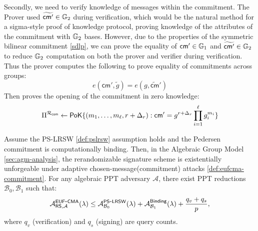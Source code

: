 Secondly, we need to verify knowledge of messages within the commitment. The Prover used $\widetilde{\mathsf{cm}'} \in \mathbb{G}_2$ during verification, which would be the natural method for a sigma-style proof of knowledge protocol, proving knowledge of the attributes of the commitment with $\mathbb{G}_2$ bases. However, due to the properties of the symmetric bilinear commitment \ref{sdlp}, we can prove the equality of $\mathsf{cm}' \in \mathbb{G}_1$ and $\widetilde{\mathsf{cm}'} \in \mathbb{G}_2$ to reduce $\mathbb{G}_2$ computation on both the prover and verifier during verification. 
Thus the prover computes the following to prove equality of commitments across groups:
\[
    e(\mathsf{cm}', \tilde{g}) = e(g, \widetilde{\mathsf{cm}}')
\]
Then proves the opening of the commitment in zero knowledge:
\[
 \Pi^{\mathcal{R}_{\mathsf{com}}}  \gets \mathsf{PoK}\{(m_1,\ldots,m_\ell, r + \Delta_r): \mathsf{cm}' = g^{r + \Delta_r} \prod_{i=1}^\ell g_i^{m_i}\}
\]






\begin{theorem}
Assume the PS-LRSW \ref{def:pslrsw} assumption holds and the Pedersen commitment is computationally binding. Then, in the Algebraic Group Model \ref{sec:agm-analysis}, the rerandomizable signature scheme is existentially unforgeable under adaptive chosen-message(commitment) attacks \ref{def:eufcma-commitment}. For any algebraic PPT adversary $\mathcal{A}$, there exist PPT reductions $\mathcal{B}_0, \mathcal{B}_1$ such that:
\[
\mathcal{A}^{\mathsf{EUF\mbox{-}CMA}}_{\mathsf{RS},\mathcal{A}}(\lambda) \leq \mathcal{A}^{\mathsf{PS\mbox{-}LRSW}}_{\mathcal{B}_0}(\lambda) + \mathcal{A}^{\mathsf{Binding}}_{\mathcal{B}_1}(\lambda) + \frac{q_v + q_s}{p},
\]
where $q_v$ (verification) and $q_s$ (signing) are query counts.
\end{theorem}

